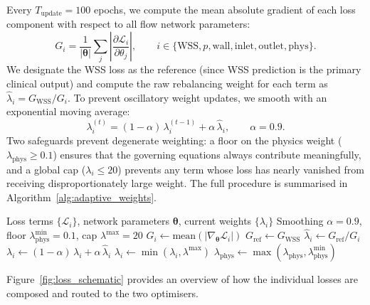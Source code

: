 \documentclass[11pt,a4paper]{article}
\begin{document}
Every $T_{\text{update}} = 100$ epochs, we compute the mean absolute gradient of each loss component with respect to all flow network parameters:
\begin{equation}
G_i = \frac{1}{|\boldsymbol{\theta}|} \sum_{j} \left| \frac{\partial \mathcal{L}_i}{\partial \theta_j} \right|, \qquad i \in \{\text{WSS}, p, \text{wall}, \text{inlet}, \text{outlet}, \text{phys}\}.
\end{equation}
We designate the WSS loss as the reference (since WSS prediction is the primary clinical output) and compute the raw rebalancing weight for each term as $\hat{\lambda}_i = G_{\text{WSS}} / G_i$. To prevent oscillatory weight updates, we smooth with an exponential moving average:
\begin{equation}
\lambda_i^{(t)} = (1 - \alpha)\,\lambda_i^{(t-1)} + \alpha\,\hat{\lambda}_i, \qquad \alpha = 0.9.
\end{equation}
Two safeguards prevent degenerate weighting: a floor on the physics weight ($\lambda_{\text{phys}} \geq 0.1$) ensures that the governing equations always contribute meaningfully, and a global cap ($\lambda_i \leq 20$) prevents any term whose loss has nearly vanished from receiving disproportionately large weight. The full procedure is summarised in Algorithm~\ref{alg:adaptive_weights}.

\begin{algorithm}[t]
\caption{Gradient-Norm Adaptive Loss Weighting}
\label{alg:adaptive_weights}
\begin{algorithmic}[1]
\Require Loss terms $\{\mathcal{L}_i\}$, network parameters $\boldsymbol{\theta}$, current weights $\{\lambda_i\}$
\Require Smoothing $\alpha = 0.9$, floor $\lambda_{\text{phys}}^{\min} = 0.1$, cap $\lambda^{\max} = 20$
    \State $G_i \gets \text{mean}(|\nabla_{\boldsymbol{\theta}} \mathcal{L}_i|)$ 
\EndFor
\State $G_{\text{ref}} \gets G_{\text{WSS}}$ 
    \State $\hat{\lambda}_i \gets G_{\text{ref}} / G_i$
    \State $\lambda_i \gets (1-\alpha)\,\lambda_i + \alpha\,\hat{\lambda}_i$ 
    \State $\lambda_i \gets \min(\lambda_i, \lambda^{\max})$ 
\EndFor
\State $\lambda_{\text{phys}} \gets \max(\lambda_{\text{phys}}, \lambda_{\text{phys}}^{\min})$ 
\end{algorithmic}
\end{algorithm}

Figure~\ref{fig:loss_schematic} provides an overview of how the individual losses are composed and routed to the two optimisers.
\end{document}
